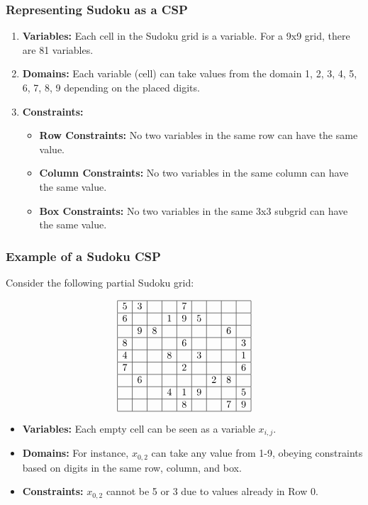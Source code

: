 \documentclass[aspectratio=169]{beamer}
\begin{document}
\begin{frame}[fragile]
    \frametitle{Representing Sudoku as a CSP}

    \begin{enumerate}
        \item \textbf{Variables:} Each cell in the Sudoku grid is a variable. For a 9x9 grid, there are 81 variables.
        
        \item \textbf{Domains:} Each variable (cell) can take values from the domain {1, 2, 3, 4, 5, 6, 7, 8, 9} depending on the placed digits.
        
        \item \textbf{Constraints:} 
        \begin{itemize}
            \item \textbf{Row Constraints:} No two variables in the same row can have the same value.
            \item \textbf{Column Constraints:} No two variables in the same column can have the same value.
            \item \textbf{Box Constraints:} No two variables in the same 3x3 subgrid can have the same value.
        \end{itemize}
    \end{enumerate}
\end{frame}

\begin{frame}[fragile]
    \frametitle{Example of a Sudoku CSP}

    Consider the following partial Sudoku grid:

    \[
    \begin{array}{|c|c|c|c|c|c|c|c|c|}
    \hline
    5 & 3 &   &   & 7 &   &   &   &   \\
    \hline
    6 &   &   & 1 & 9 & 5 &   &   &   \\
    \hline
      & 9 & 8 &   &   &   &   & 6 &   \\
    \hline
    8 &   &   &   & 6 &   &   &   & 3 \\
    \hline
    4 &   &   & 8 &   & 3 &   &   & 1 \\
    \hline
    7 &   &   &   & 2 &   &   &   & 6 \\
    \hline
      & 6 &   &   &   &   & 2 & 8 &   \\
    \hline
       &   &   & 4 & 1 & 9 &   &   & 5 \\
    \hline
       &   &   &   & 8 &   &   & 7 & 9 \\
    \hline
    \end{array}
    \]

    \begin{itemize}
        \item \textbf{Variables:} Each empty cell can be seen as a variable \( x_{i,j} \).
        \item \textbf{Domains:} For instance, \( x_{0,2} \) can take any value from 1-9, obeying constraints based on digits in the same row, column, and box.
        \item \textbf{Constraints:} \( x_{0,2} \) cannot be 5 or 3 due to values already in Row 0.
    \end{itemize}
\end{frame}
\end{document}
